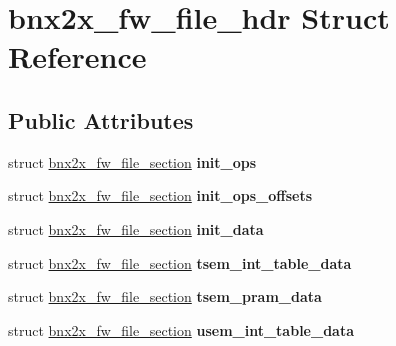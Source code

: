 \hypertarget{structbnx2x__fw__file__hdr}{
\section{bnx2x\_\-fw\_\-file\_\-hdr Struct Reference}
\label{structbnx2x__fw__file__hdr}
}
\subsection*{Public Attributes}
\begin{DoxyCompactItemize}
\item 
\hypertarget{structbnx2x__fw__file__hdr_a345b14b05edbd6ecba3c41d9c5a0cd2d}{
struct \hyperlink{structbnx2x__fw__file__section}{bnx2x\_\-fw\_\-file\_\-section} {\bfseries init\_\-ops}}
\label{structbnx2x__fw__file__hdr_a345b14b05edbd6ecba3c41d9c5a0cd2d}

\item 
\hypertarget{structbnx2x__fw__file__hdr_a38a323b6ecbaafaa842c11abd6b055a6}{
struct \hyperlink{structbnx2x__fw__file__section}{bnx2x\_\-fw\_\-file\_\-section} {\bfseries init\_\-ops\_\-offsets}}
\label{structbnx2x__fw__file__hdr_a38a323b6ecbaafaa842c11abd6b055a6}

\item 
\hypertarget{structbnx2x__fw__file__hdr_a21b5642602352a94d2911d004d0e1496}{
struct \hyperlink{structbnx2x__fw__file__section}{bnx2x\_\-fw\_\-file\_\-section} {\bfseries init\_\-data}}
\label{structbnx2x__fw__file__hdr_a21b5642602352a94d2911d004d0e1496}

\item 
\hypertarget{structbnx2x__fw__file__hdr_acd42b9aa654873f9af77eac8ae82a51a}{
struct \hyperlink{structbnx2x__fw__file__section}{bnx2x\_\-fw\_\-file\_\-section} {\bfseries tsem\_\-int\_\-table\_\-data}}
\label{structbnx2x__fw__file__hdr_acd42b9aa654873f9af77eac8ae82a51a}

\item 
\hypertarget{structbnx2x__fw__file__hdr_a868f30b21ab73b3fb3e97a86d1fee532}{
struct \hyperlink{structbnx2x__fw__file__section}{bnx2x\_\-fw\_\-file\_\-section} {\bfseries tsem\_\-pram\_\-data}}
\label{structbnx2x__fw__file__hdr_a868f30b21ab73b3fb3e97a86d1fee532}

\item 
\hypertarget{structbnx2x__fw__file__hdr_ae8ad26fff326e0a4c12f7701e84e22c5}{
struct \hyperlink{structbnx2x__fw__file__section}{bnx2x\_\-fw\_\-file\_\-section} {\bfseries usem\_\-int\_\-table\_\-data}}
\label{structbnx2x__fw__file__hdr_ae8ad26fff326e0a4c12f7701e84e22c5}


\end{DoxyCompactItemize}
